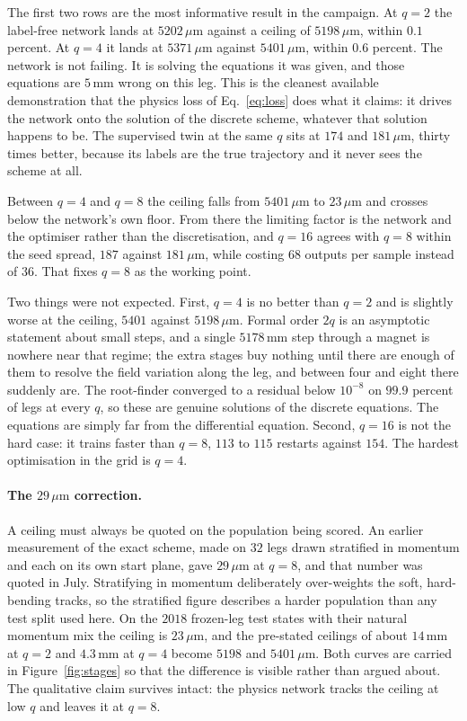 \documentclass[11pt,a4paper]{article}
\newcommand{\um}{\ensuremath{\,\mu\mathrm{m}}}
\newcommand{\mm}{\ensuremath{\,\mathrm{mm}}}
\begin{document}
The first two rows are the most informative result in the campaign. At $q = 2$
the label-free network lands at $5202\um$ against a ceiling of $5198\um$, within
$0.1$ percent. At $q = 4$ it lands at $5371\um$ against $5401\um$, within $0.6$
percent. The network is not failing. It is solving the equations it was given,
and those equations are $5\mm$ wrong on this leg. This is the cleanest available
demonstration that the physics loss of Eq.~\eqref{eq:loss} does what it claims:
it drives the network onto the solution of the discrete scheme, whatever that
solution happens to be. The supervised twin at the same $q$ sits at $174$ and
$181\um$, thirty times better, because its labels are the true trajectory and it
never sees the scheme at all.

Between $q = 4$ and $q = 8$ the ceiling falls from $5401\um$ to $23\um$ and
crosses below the network's own floor. From there the limiting factor is the
network and the optimiser rather than the discretisation, and $q = 16$ agrees
with $q = 8$ within the seed spread, $187$ against $181\um$, while costing $68$
outputs per sample instead of $36$. That fixes $q = 8$ as the working point.

Two things were not expected. First, $q = 4$ is no better than $q = 2$ and is
slightly worse at the ceiling, $5401$ against $5198\um$. Formal order $2q$ is an
asymptotic statement about small steps, and a single $5178\mm$ step through a
magnet is nowhere near that regime; the extra stages buy nothing until there are
enough of them to resolve the field variation along the leg, and between four
and eight there suddenly are. The root-finder converged to a residual below
$10^{-8}$ on $99.9$ percent of legs at every $q$, so these are genuine solutions
of the discrete equations. The equations are simply far from the differential
equation. Second, $q = 16$ is not the hard case: it trains faster than $q = 8$,
$113$ to $115$ restarts against $154$. The hardest optimisation in the grid is
$q = 4$.

\paragraph{The \texorpdfstring{$29\um$}{29 micrometre} correction.}
A ceiling must always be quoted on the population being scored. An earlier
measurement of the exact scheme, made on $32$ legs drawn stratified in momentum
and each on its own start plane, gave $29\um$ at $q = 8$, and that number was
quoted in July. Stratifying in momentum deliberately over-weights the soft,
hard-bending tracks, so the stratified figure describes a harder population than
any test split used here. On the $2018$ frozen-leg test states with their natural
momentum mix the ceiling is $23\um$, and the pre-stated ceilings of about
$14\mm$ at $q = 2$ and $4.3\mm$ at $q = 4$ become $5198$ and $5401\um$. Both
curves are carried in Figure~\ref{fig:stages} so that the difference is visible
rather than argued about. The qualitative claim survives intact: the physics
network tracks the ceiling at low $q$ and leaves it at $q = 8$.
\end{document}
